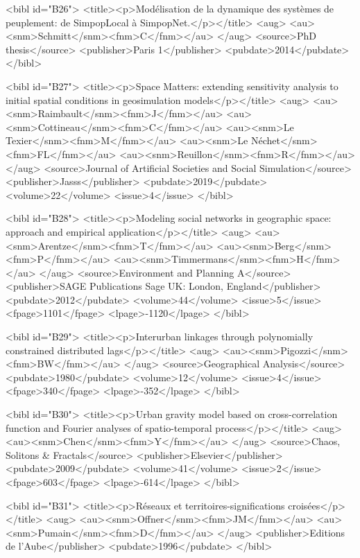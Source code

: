 \documentclass{article}
\begin{document}
{<bibl id="B26">
  <title><p>Mod{\'e}lisation de la dynamique des syst{\`e}mes de peuplement: de
  SimpopLocal {\`a} SimpopNet.</p></title>
  <aug>
    <au><snm>Schmitt</snm><fnm>C</fnm></au>
  </aug>
  <source>PhD thesis</source>
  <publisher>Paris 1</publisher>
  <pubdate>2014</pubdate>
</bibl>

<bibl id="B27">
  <title><p>Space Matters: extending sensitivity analysis to initial spatial
  conditions in geosimulation models</p></title>
  <aug>
    <au><snm>Raimbault</snm><fnm>J</fnm></au>
    <au><snm>Cottineau</snm><fnm>C</fnm></au>
    <au><snm>Le Texier</snm><fnm>M</fnm></au>
    <au><snm>Le N{\'e}chet</snm><fnm>FL</fnm></au>
    <au><snm>Reuillon</snm><fnm>R</fnm></au>
  </aug>
  <source>Journal of Artificial Societies and Social Simulation</source>
  <publisher>Jasss</publisher>
  <pubdate>2019</pubdate>
  <volume>22</volume>
  <issue>4</issue>
</bibl>

<bibl id="B28">
  <title><p>Modeling social networks in geographic space: approach and
  empirical application</p></title>
  <aug>
    <au><snm>Arentze</snm><fnm>T</fnm></au>
    <au><snm>Berg</snm><fnm>P</fnm></au>
    <au><snm>Timmermans</snm><fnm>H</fnm></au>
  </aug>
  <source>Environment and Planning A</source>
  <publisher>SAGE Publications Sage UK: London, England</publisher>
  <pubdate>2012</pubdate>
  <volume>44</volume>
  <issue>5</issue>
  <fpage>1101</fpage>
  <lpage>-1120</lpage>
</bibl>

<bibl id="B29">
  <title><p>Interurban linkages through polynomially constrained distributed
  lags</p></title>
  <aug>
    <au><snm>Pigozzi</snm><fnm>BW</fnm></au>
  </aug>
  <source>Geographical Analysis</source>
  <pubdate>1980</pubdate>
  <volume>12</volume>
  <issue>4</issue>
  <fpage>340</fpage>
  <lpage>-352</lpage>
</bibl>

<bibl id="B30">
  <title><p>Urban gravity model based on cross-correlation function and Fourier
  analyses of spatio-temporal process</p></title>
  <aug>
    <au><snm>Chen</snm><fnm>Y</fnm></au>
  </aug>
  <source>Chaos, Solitons \& Fractals</source>
  <publisher>Elsevier</publisher>
  <pubdate>2009</pubdate>
  <volume>41</volume>
  <issue>2</issue>
  <fpage>603</fpage>
  <lpage>-614</lpage>
</bibl>

<bibl id="B31">
  <title><p>R{\'e}seaux et territoires-significations crois{\'e}es</p></title>
  <aug>
    <au><snm>Offner</snm><fnm>JM</fnm></au>
    <au><snm>Pumain</snm><fnm>D</fnm></au>
  </aug>
  <publisher>Editions de l'Aube</publisher>
  <pubdate>1996</pubdate>
</bibl>

}
\end{document}
